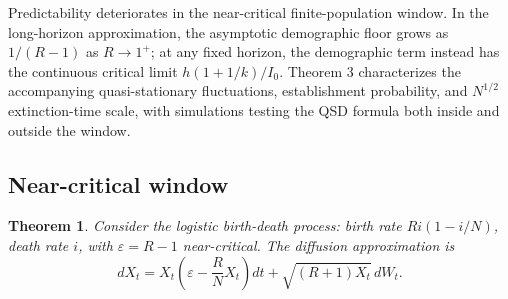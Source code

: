 \documentclass[review]{elsarticle}
\theoremstyle{plain}
\newtheorem{theorem}{Theorem}
\theoremstyle{definition}
\begin{document}
Predictability deteriorates in the near-critical finite-population window. In the long-horizon approximation, the asymptotic demographic floor grows as $1/(R-1)$ as $R\to1^+$; at any fixed horizon, the demographic term instead has the continuous critical limit $h(1+1/k)/I_0$. Theorem 3 characterizes the accompanying quasi-stationary fluctuations, establishment probability, and $N^{1/2}$ extinction-time scale, with simulations testing the QSD formula both inside and outside the window.



\subsection{Near-critical window}
\begin{theorem}
Consider the logistic birth-death process: birth rate $R i (1 - i/N)$, death rate $i$, with $\varepsilon = R - 1$ near-critical. The diffusion approximation is
\begin{equation}
dX_t = X_t\left(\varepsilon - \frac{R}{N}X_t\right)dt + \sqrt{(R+1)X_t}\, dW_t.
\end{equation}


\end{theorem}
\end{document}
